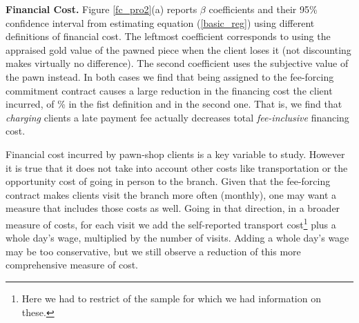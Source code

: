 \documentclass[11pt]{article}
\begin{document}
\vspace{.2in}
\noindent \textbf{Financial Cost.} Figure \ref{fc_pro2}(a) reports $\beta$ coefficients and their 95\% confidence interval from estimating equation (\ref{basic_reg}) using different definitions of financial cost. The leftmost coefficient corresponds to using the appraised gold value of the pawned piece when the client loses it (not discounting makes virtually no difference). The second coefficient uses the subjective value of the pawn instead. In both cases we find that being assigned to the fee-forcing commitment contract causes a large reduction in the financing cost the client incurred, of \% in the fist definition and  in the second one. That is, we find that \textit{charging} clients a late payment fee  actually decreases total \textit{fee-inclusive} financing cost. 

Financial cost incurred by pawn-shop clients is a key variable to study. However it is true that it does not take into account other costs like transportation or the opportunity cost of going in person to the branch. Given that the fee-forcing contract makes clients visit the branch more often (monthly), one may want a measure that includes those costs as well. Going in that direction, in a broader measure of costs, for each visit we add the self-reported transport cost\footnote{Here we had to restrict  of the sample for which we had information on these.} plus a whole day's wage, multiplied by the number of visits. Adding a whole day's wage may be too conservative, but we still observe a reduction of this more comprehensive measure of cost. 
\end{document}
